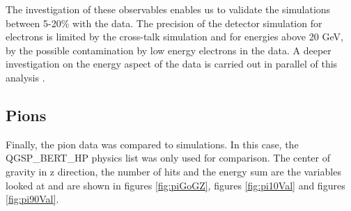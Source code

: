The investigation of these observables enables us to validate the simulations between 5-20\% with the data. The precision of the detector simulation for electrons is limited by the cross-talk simulation and for energies above 20 GeV, by the possible contamination by low energy electrons in the data. A deeper investigation on the energy aspect of the data is carried out in parallel of this analysis \cite{AmbraEnergy}.

\subsection{Pions}

Finally, the pion data was compared to simulations. In this case, the QGSP\_BERT\_HP physics list was only used for comparison. The center of gravity in z direction, the number of hits and the energy sum are the variables looked at and are shown in figures \ref{fig:piGoGZ}, figures \ref{fig:pi10Val} and figures \ref{fig:pi90Val}.


